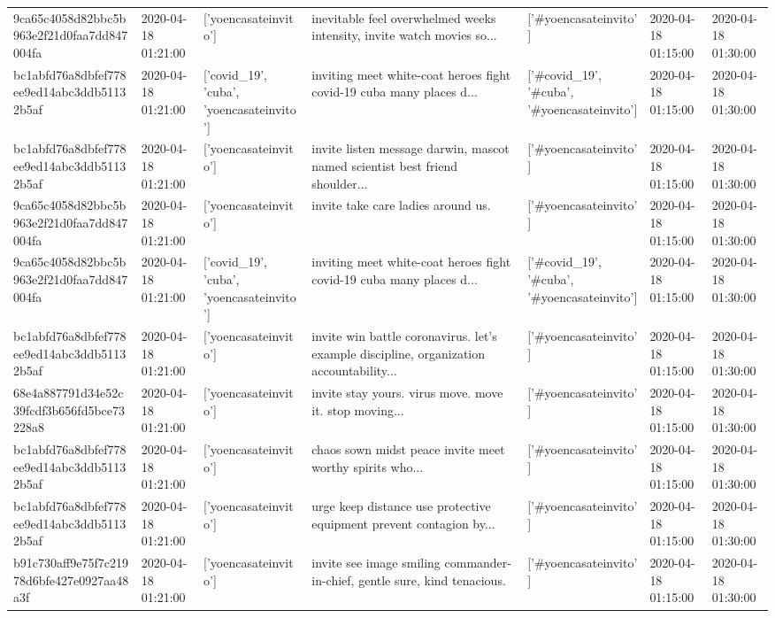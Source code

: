 \begin{tabular}{lllllll}
9ca65c4058d82bbc5b963e2f21d0faa7dd847004fa & 2020-04-18 01:21:00 & ['yoencasateinvito'] & inevitable feel overwhelmed weeks intensity, invite watch movies so... & ['#yoencasateinvito'] & 2020-04-18 01:15:00 & 2020-04-18 01:30:00 \\
bc1abfd76a8dbfef778ee9ed14abc3ddb51132b5af & 2020-04-18 01:21:00 & ['covid_19', 'cuba', 'yoencasateinvito'] & inviting meet white-coat heroes fight covid-19 cuba many places d... & ['#covid_19', '#cuba', '#yoencasateinvito'] & 2020-04-18 01:15:00 & 2020-04-18 01:30:00 \\
bc1abfd76a8dbfef778ee9ed14abc3ddb51132b5af & 2020-04-18 01:21:00 & ['yoencasateinvito'] & invite listen message darwin, mascot named scientist best friend shoulder... & ['#yoencasateinvito'] & 2020-04-18 01:15:00 & 2020-04-18 01:30:00 \\
9ca65c4058d82bbc5b963e2f21d0faa7dd847004fa & 2020-04-18 01:21:00 & ['yoencasateinvito'] & invite take care ladies around us. & ['#yoencasateinvito'] & 2020-04-18 01:15:00 & 2020-04-18 01:30:00 \\
9ca65c4058d82bbc5b963e2f21d0faa7dd847004fa & 2020-04-18 01:21:00 & ['covid_19', 'cuba', 'yoencasateinvito'] & inviting meet white-coat heroes fight covid-19 cuba many places d... & ['#covid_19', '#cuba', '#yoencasateinvito'] & 2020-04-18 01:15:00 & 2020-04-18 01:30:00 \\
bc1abfd76a8dbfef778ee9ed14abc3ddb51132b5af & 2020-04-18 01:21:00 & ['yoencasateinvito'] & invite win battle coronavirus. let's example discipline, organization accountability... & ['#yoencasateinvito'] & 2020-04-18 01:15:00 & 2020-04-18 01:30:00 \\
68e4a887791d34e52c39fcdf3b656fd5bce73228a8 & 2020-04-18 01:21:00 & ['yoencasateinvito'] & invite stay yours. virus move. move it. stop moving... & ['#yoencasateinvito'] & 2020-04-18 01:15:00 & 2020-04-18 01:30:00 \\
bc1abfd76a8dbfef778ee9ed14abc3ddb51132b5af & 2020-04-18 01:21:00 & ['yoencasateinvito'] & chaos sown midst peace invite meet worthy spirits who... & ['#yoencasateinvito'] & 2020-04-18 01:15:00 & 2020-04-18 01:30:00 \\
bc1abfd76a8dbfef778ee9ed14abc3ddb51132b5af & 2020-04-18 01:21:00 & ['yoencasateinvito'] & urge keep distance use protective equipment prevent contagion by... & ['#yoencasateinvito'] & 2020-04-18 01:15:00 & 2020-04-18 01:30:00 \\
b91c730aff9e75f7c21978d6bfe427e0927aa48a3f & 2020-04-18 01:21:00 & ['yoencasateinvito'] & invite see image smiling commander-in-chief, gentle sure, kind tenacious. & ['#yoencasateinvito'] & 2020-04-18 01:15:00 & 2020-04-18 01:30:00 \\

\end{tabular}
